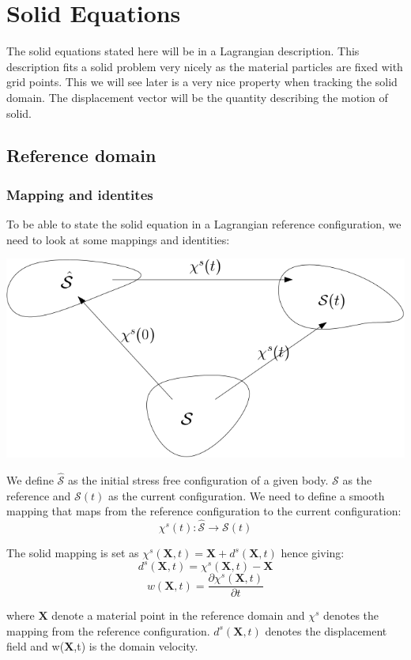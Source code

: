 \chapter*{Solid Equations}
The solid equations stated here will be in a Lagrangian description. This description fits a solid problem very nicely as the material particles are fixed with grid points. This we will see later is a very nice property when tracking the solid domain. The displacement vector will be the quantity describing the motion of solid.
\section*{Reference domain}
\subsection*{Mapping and identites}
To be able to state the solid equation in a Lagrangian reference configuration, we need to look at some mappings and identities:
\begin{center}
\includegraphics[scale=0.4]{continuum_mapping.png}
\end{center}
We define $ \hat{\mathcal{S}}$ as the initial stress free configuration of a given body. $\mathcal{S}$ as the reference and $\mathcal{S}(t)$ as the current configuration.
We need to define a smooth mapping that maps from the reference configuration to the current configuration:
$$  \chi^s(t) : \hat{\mathcal{S}} \rightarrow \mathcal{S}(t)     $$ 

The solid mapping is set as $\chi^s(\textbf{X},t) = \textbf{X}  + d^s(\textbf{X} ,t)$
hence giving:
$$  d^s(\textbf{X},t) = \chi^s(\textbf{X},t) -\textbf{X}   $$
$$  w(\textbf{X},t) = \frac{\partial \chi^s(\textbf{X},t)}{\partial t}   $$

where $\textbf{X}$ denote a material point in the reference domain and $\chi^s$ denotes the mapping from the reference configuration. 
$d^s(\textbf{X},t)$ denotes the displacement field and w(\textbf{X},t) is the domain velocity.

